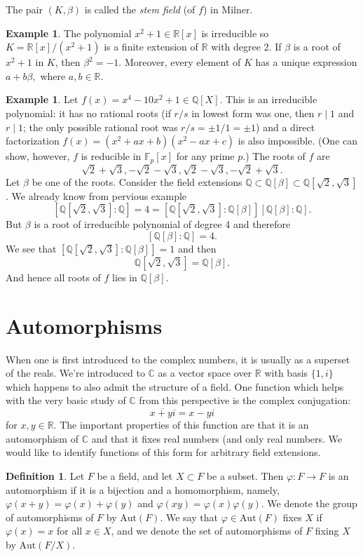 \documentclass[12pt]{report}
\theoremstyle{definition}
\newtheorem{definition}[theorem]{Definition}
\newtheorem{example}[theorem]{Example}
\newcommand{\Aut}{\text{Aut}}
\newcommand{\CC}{\mathbb{C}}
\newcommand{\QQ}{\mathbb{Q}}
\newcommand{\RR}{\mathbb{R}}
\newcommand{\FF}{\mathbb{F}}
\begin{document}
\begin{remark}
	The pair $(K,\beta)$ is called the \emph{stem field} (of $f$) in Milner.
\end{remark}

\begin{example}
	The polynomial $x^2+1\in \RR[x]$ is irreducible so $K=\RR[x]/(x^2+1)$ is a finite extension of $\RR$ with degree 2. If $\beta$ is a root of $x^2+1$ in $K$, then $\beta^2=-1$. Moreover, every element of $K$ has a unique expression $a+b\beta,$ where $a,b\in \RR$.
\end{example}

\begin{example}
	Let $f(x)= x^4-10x^2+1\in \QQ[X]$. This is an irreducible polynomial: it has no rational roots (if $r/s$ in lowest form was one, then $r\mid 1$ and $r\mid 1$; the only possible rational root was $r/s =\pm 1/1=\pm 1$) and a direct factorization $f(x)=(x^2+ax+b)(x^2-ax+c)$ is also impossible. (One can show, however, $f$ is reducible in $\FF_p[x]$ for any prime $p$.) The roots of $f$ are $$\sqrt{2}+\sqrt{3}, -\sqrt{2}-\sqrt{3}, \sqrt{2}-\sqrt{3}, -\sqrt{2}+\sqrt{3}.$$
	Let $\beta$ be one of the roots. Consider the field extensions $\QQ\subset\QQ[\beta]\subset \QQ[\sqrt{2},\sqrt{3}]$. We already know from pervious example $$[\QQ[\sqrt{2},\sqrt{3}]:\QQ]=4=[\QQ[\sqrt{2},\sqrt{3}]:\QQ[\beta]][\QQ[\beta]:\QQ].$$ But $\beta$ is a root of irreducible polynomial of degree 4 and therefore $$[\QQ[\beta]:\QQ]=4.$$
	We see that $[\QQ[\sqrt{2},\sqrt{3}]:\QQ[\beta]]=1$ and then $$\QQ[\sqrt{2},\sqrt{3}]=\QQ[\beta].$$
	And hence all roots of $f$ lies in $\QQ[\beta]$.
\end{example}

\section{Automorphisms}
When one is first introduced to the complex numbers, it is usually as a superset of the reals. We're introduced to $\CC$ as a vector space over $\RR$ with basis $\{1,i\}$ which happens to also admit the structure of a field. One function which helps with the very basic study of $\CC$ from this perspective is the complex conjugation: $$\overline{x+yi}=x-yi$$ for $x,y\in \RR$. The important properties of this function are that it is an automorphism of $\CC$ and that it fixes real numbers (and only real numbers. We would like to identify functions of this form for arbitrary field extensions.

\begin{definition}
	Let $F$ be a field, and let $X \subset F$ be a subset. Then $\varphi: F \to F$ is an automorphism if it is a bijection and a homomorphism, namely, $\varphi(x+y)=\varphi(x)+\varphi(y)$ and $\varphi(xy)=\varphi(x)\varphi(y)$. We denote the group of automorphisms of $F$ by $\Aut(F)$. We say that $\varphi\in \Aut(F)$ fixes $X$ if $\varphi(x) = x$ for all $x \in X$, and we denote the set of automorphisms of $F$ fixing $X$ by $\Aut(F/X)$.
\end{definition}
\end{document}
